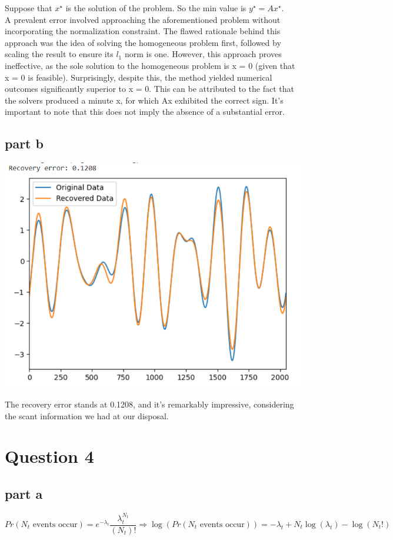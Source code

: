 \documentclass{uofa-eng-assignment}
\begin{document}
Suppose that $x^\star$ is the solution of the problem. So the min  value is $y^\star = Ax^\star$.\\
A prevalent error involved approaching the aforementioned problem without incorporating the normalization constraint. The flawed rationale behind this approach was the idea of solving the homogeneous problem first, followed by scaling the result to ensure its $l_1$ norm is one. However, this approach proves ineffective, as the sole solution to the homogeneous problem is x = 0 (given that x = 0 is feasible). Surprisingly, despite this, the method yielded numerical outcomes significantly superior to x = 0. This can be attributed to the fact that the solvers produced a minute x, for which Ax exhibited the correct sign. It's important to note that this does not imply the absence of a substantial error.






\subsection*{part b}
\begin{center}
	\includegraphics[width=0.6\linewidth]{screenshot007}
\end{center}

The recovery error stands at 0.1208, and it's remarkably impressive, considering the scant information we had at our disposal.


\section*{Question 4}

\subsection*{part a}
\[
Pr(N_t \text{ events occur}) = e^{-\lambda_t} \frac{\lambda_t^{N_t}}{(N_t)!} \Rightarrow \log (Pr(N_t \text{ events occur})) = -\lambda_t + N_t \log (\lambda_t) - \log(N_t!)
\]
\end{document}
